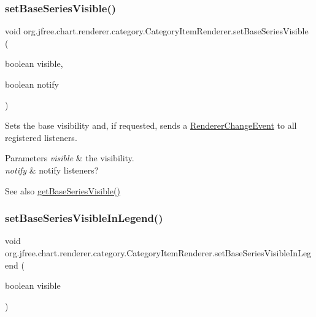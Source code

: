 \subsubsection{\texorpdfstring{set\+Base\+Series\+Visible()}{setBaseSeriesVisible()}\hspace{0.1cm}{\footnotesize\ttfamily [2/2]}}
{\footnotesize\ttfamily void org.\+jfree.\+chart.\+renderer.\+category.\+Category\+Item\+Renderer.\+set\+Base\+Series\+Visible (\begin{DoxyParamCaption}\item[{boolean}]{visible,  }\item[{boolean}]{notify }\end{DoxyParamCaption})}

Sets the base visibility and, if requested, sends a \mbox{\hyperlink{}{Renderer\+Change\+Event}} to all registered listeners.


\begin{DoxyParams}{Parameters}
{\em visible} & the visibility. \\
\hline
{\em notify} & notify listeners?\\
\hline
\end{DoxyParams}
\begin{DoxySeeAlso}{See also}
\mbox{\hyperlink{interfaceorg_1_1jfree_1_1chart_1_1renderer_1_1category_1_1_category_item_renderer_a7f6fcee9da6a61416616995353566042}{get\+Base\+Series\+Visible()}} 
\end{DoxySeeAlso}
\mbox{\label{interfaceorg_1_1jfree_1_1chart_1_1renderer_1_1category_1_1_category_item_renderer_a2581902144013c603baed487e99eb7bd}} 
\subsubsection{\texorpdfstring{set\+Base\+Series\+Visible\+In\+Legend()}{setBaseSeriesVisibleInLegend()}\hspace{0.1cm}{\footnotesize\ttfamily [1/2]}}
{\footnotesize\ttfamily void org.\+jfree.\+chart.\+renderer.\+category.\+Category\+Item\+Renderer.\+set\+Base\+Series\+Visible\+In\+Legend (\begin{DoxyParamCaption}\item[{boolean}]{visible }\end{DoxyParamCaption})}

